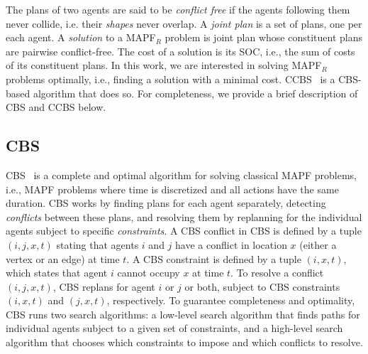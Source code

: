 \documentclass[letterpaper]{article} %
\newcommand\konstantin[1]{\nb{\textbf{Konstantin:}}{red}{#1}}
\newcommand{\cbs}{\ac{CBS}\xspace}
\newcommand{\ccbs}{\ac{CCBS}\xspace}
\newcommand{\soc}{\ac{SOC}\xspace}
\newcommand{\mapfr}{{MAPF}$_R$\xspace}
\newcommand{\mapf}{\ac{MAPF}\xspace}
\begin{document}
The plans of two agents are said to be \emph{conflict free} if the agents following them never collide, i.e. their \emph{shapes} never overlap.
A \emph{joint plan} is a set of plans, one per each agent.
A \emph{solution} to a \mapfr problem is joint plan whose constituent plans are pairwise conflict-free.
The cost of a solution is its \soc, i.e., the sum of costs of its constituent plans.
In this work, we are interested in solving \mapfr problems optimally, i.e., finding a  solution with a minimal cost. %
\ccbs~\cite{andreychuk2019multi} is a \cbs-based algorithm that does so.
For completeness, we provide a brief description of \cbs and \ccbs below.





\subsection{\acf{CBS}}

\cbs~\cite{sharon2015conflict} is a complete and optimal algorithm for solving classical \mapf problems, i.e., \mapf problems where time is discretized and all actions have the same duration.
\cbs works by finding plans for each agent separately, detecting \emph{conflicts} between these plans, and resolving them by replanning for the individual agents subject to specific \emph{constraints}.
A \cbs conflict in \cbs is defined by a tuple $(i,j,x,t)$
stating that agents $i$ and $j$ have a conflict in location $x$ (either a vertex or an edge) at time $t$. A \cbs constraint is defined by a tuple $(i,x,t)$, which states that agent $i$ cannot occupy $x$ at time $t$.
To resolve a conflict $(i,j,x,t)$, \cbs replans for agent $i$ or $j$ or both, subject to \cbs constraints $(i,x,t)$ and $(j,x,t)$, respectively.
To guarantee completeness and optimality, \cbs runs two search algorithms: a low-level search algorithm that finds paths for individual agents subject to a given set of constraints, and a high-level search algorithm that chooses which constraints to impose and which conflicts to resolve.



\end{document}
